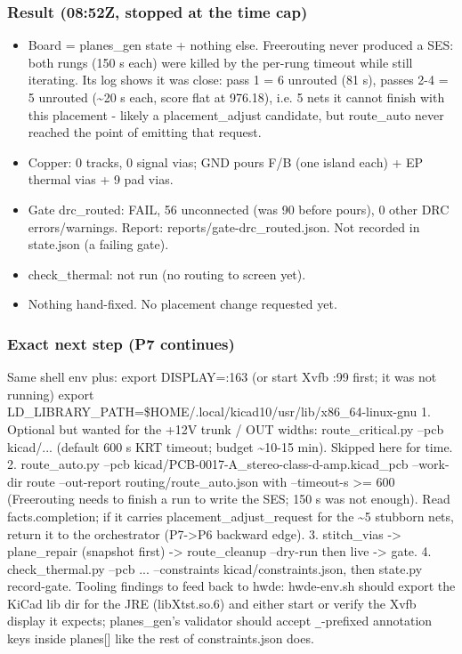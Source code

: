 \documentclass[11pt]{article}
\begin{document}
\subsubsection*{Result (08:52Z, stopped at the time cap)}
\begin{itemize}
\item Board = planes\_gen state + nothing else. Freerouting never produced a SES: both rungs
(150 s each) were killed by the per-rung timeout while still iterating. Its log shows it was
close: pass 1 = 6 unrouted (81 s), passes 2-4 = 5 unrouted (\textasciitilde{}20 s each, score flat at 976.18),
i.e. 5 nets it cannot finish with this placement - likely a placement\_adjust candidate, but
route\_auto never reached the point of emitting that request.
\item Copper: 0 tracks, 0 signal vias; GND pours F/B (one island each) + EP thermal vias + 9 pad vias.
\item Gate drc\_routed: FAIL, 56 unconnected (was 90 before pours), 0 other DRC errors/warnings.
Report: reports/gate-drc\_routed.json. Not recorded in state.json (a failing gate).
\item check\_thermal: not run (no routing to screen yet).
\item Nothing hand-fixed. No placement change requested yet.
\end{itemize}
\subsubsection*{Exact next step (P7 continues)}
Same shell env plus: export DISPLAY=:163   (or start Xvfb :99 first; it was not running) export LD\_LIBRARY\_PATH=\$HOME/.local/kicad10/usr/lib/x86\_64-linux-gnu 1. Optional but wanted for the +12V trunk / OUT widths: route\_critical.py --pcb kicad/... (default 600 s KRT timeout; budget \textasciitilde{}10-15 min). Skipped here for time. 2. route\_auto.py --pcb kicad/PCB-0017-A\_stereo-class-d-amp.kicad\_pcb --work-dir route --out-report routing/route\_auto.json with --timeout-s \textgreater{}= 600 (Freerouting needs to finish a run to write the SES; 150 s was not enough). Read facts.completion; if it carries placement\_adjust\_request for the \textasciitilde{}5 stubborn nets, return it to the orchestrator (P7-\textgreater{}P6 backward edge). 3. stitch\_vias -\textgreater{} plane\_repair (snapshot first) -\textgreater{} route\_cleanup --dry-run then live -\textgreater{} gate. 4. check\_thermal.py --pcb ... --constraints kicad/constraints.json, then state.py record-gate. Tooling findings to feed back to hwde: hwde-env.sh should export the KiCad lib dir for the JRE (libXtst.so.6) and either start or verify the Xvfb display it expects; planes\_gen's validator should accept \texttt{\_}-prefixed annotation keys inside planes{[}{]} like the rest of constraints.json does.
\end{document}
